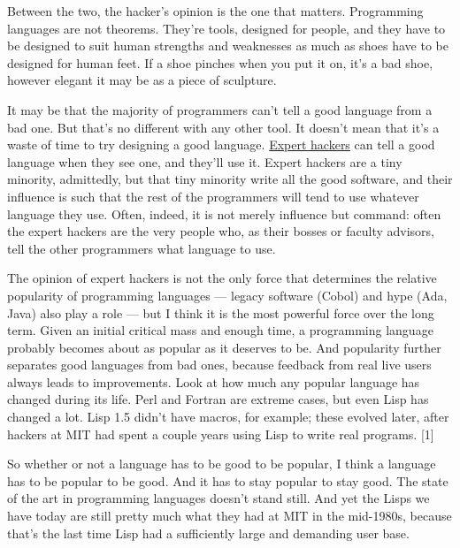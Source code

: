 Between the two, the
                  hacker's opinion is the one that matters. Programming
                  languages are not theorems. They're tools, designed for
                  people, and they have to be designed to suit human strengths
                  and weaknesses as much as shoes have to be designed for human
                  feet. If a shoe pinches when you put it on, it's a bad shoe,
                  however elegant it may be as a piece of sculpture.

It
                  may be that the majority of programmers can't tell a good
                  language from a bad one. But that's no different with any
                  other tool. It doesn't mean that it's a waste of time to try
                  designing a good language.
                  \href{http://www.paulgraham.com/design.html}{Expert hackers} can tell a good
                  language when they see one, and they'll use it. Expert hackers
                  are a tiny minority, admittedly, but that tiny minority write
                  all the good software, and their influence is such that the
                  rest of the programmers will tend to use whatever language
                  they use. Often, indeed, it is not merely influence but
                  command: often the expert hackers are the very people who, as
                  their bosses or faculty advisors, tell the other programmers
                  what language to use.

The opinion of expert hackers
                  is not the only force that determines the relative popularity
                  of programming languages --- legacy software (Cobol) and
                  hype (Ada, Java) also play a role --- but I think it is
                  the most powerful force over the long term. Given an initial
                  critical mass and enough time, a programming language probably
                  becomes about as popular as it deserves to be. And popularity
                  further separates good languages from bad ones, because
                  feedback from real live users always leads to improvements.
                  Look at how much any popular language has changed during its
                  life. Perl and Fortran are extreme cases, but even Lisp has
                  changed a lot. Lisp 1.5 didn't have macros, for example; these
                  evolved later, after hackers at MIT had spent a couple years
                  using Lisp to write real programs. [1]

So whether
                  or not a language has to be good to be popular, I think a
                  language has to be popular to be good. And it has to stay
                  popular to stay good. The state of the art in programming
                  languages doesn't stand still. And yet the Lisps we have today
                  are still pretty much what they had at MIT in the mid-1980s,
                  because that's the last time Lisp had a sufficiently large and
                  demanding user base.

